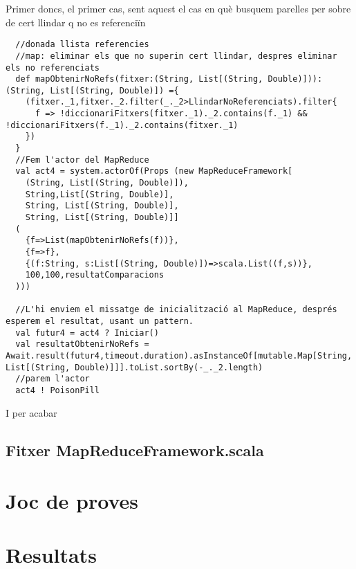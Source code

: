 \documentclass[11pt,a4paper,twoside]{report}
\begin{document}
Primer doncs, el primer cas, sent aquest el cas en què busquem parelles per sobre de cert llindar q no es referenciïn
\begin{lstlisting}
  //donada llista referencies
  //map: eliminar els que no superin cert llindar, despres eliminar els no referenciats
  def mapObtenirNoRefs(fitxer:(String, List[(String, Double)])):(String, List[(String, Double)]) ={
    (fitxer._1,fitxer._2.filter(_._2>LlindarNoReferenciats).filter{
      f => !diccionariFitxers(fitxer._1)._2.contains(f._1) && !diccionariFitxers(f._1)._2.contains(fitxer._1)
    })
  }
  //Fem l'actor del MapReduce
  val act4 = system.actorOf(Props (new MapReduceFramework[
    (String, List[(String, Double)]),
    String,List[(String, Double)],
    String, List[(String, Double)],
    String, List[(String, Double)]]
  (
    {f=>List(mapObtenirNoRefs(f))},
    {f=>f},
    {(f:String, s:List[(String, Double)])=>scala.List((f,s))},
    100,100,resultatComparacions
  )))

  //L'hi enviem el missatge de inicialització al MapReduce, després esperem el resultat, usant un pattern.
  val futur4 = act4 ? Iniciar()
  val resultatObtenirNoRefs = Await.result(futur4,timeout.duration).asInstanceOf[mutable.Map[String, List[(String, Double)]]].toList.sortBy(-_._2.length)
  //parem l'actor
  act4 ! PoisonPill
\end{lstlisting}

I per acabar




\section{Fitxer MapReduceFramework.scala}




\chapter{Joc de proves}

\chapter{Resultats}
\end{document}
